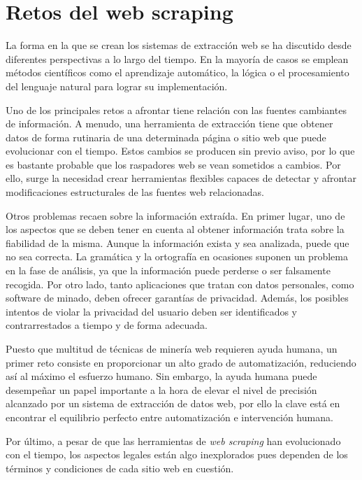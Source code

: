 \section{Retos del web scraping}
\label{sec:retos del web scraping}

La forma en la que se crean los sistemas de extracción web se ha discutido desde diferentes perspectivas
a lo largo del tiempo. En la mayoría de casos se emplean métodos científicos como el aprendizaje automático,
la lógica o el procesamiento del lenguaje natural para lograr su implementación.

Uno de los principales retos a afrontar tiene relación con las fuentes cambiantes de información. A menudo,
una herramienta de extracción tiene que obtener datos de forma rutinaria de una determinada página o sitio
web que puede evolucionar con el tiempo. Estos cambios se producen sin previo aviso, por lo que es bastante 
probable que los raspadores web se vean sometidos a cambios. Por ello, surge la necesidad crear herramientas 
flexibles capaces de detectar y afrontar modificaciones estructurales de las fuentes web relacionadas.

Otros problemas recaen sobre la información extraída. En primer lugar, uno de los aspectos que se deben
tener en cuenta al obtener información trata sobre la fiabilidad de la misma. Aunque la información exista
y sea analizada, puede que no sea correcta. La gramática y la ortografía en ocasiones suponen un problema
en la fase de análisis, ya que la información puede perderse o ser falsamente recogida. Por otro lado,
tanto aplicaciones que tratan con datos personales, como software de minado, deben ofrecer garantías de
privacidad. Además, los posibles intentos de violar la privacidad del usuario deben ser identificados
y contrarrestados a tiempo y de forma adecuada.

Puesto que multitud de técnicas de minería web requieren ayuda humana, un primer reto consiste en
proporcionar un alto grado de automatización, reduciendo así al máximo el esfuerzo humano. Sin embargo,
la ayuda humana puede desempeñar un papel importante a la hora de elevar el nivel de precisión alcanzado
por un sistema de extracción de datos web, por ello la clave está en encontrar el equilibrio perfecto entre
automatización e intervención humana.

Por último, a pesar de que las herramientas de \emph{web scraping} han evolucionado con el tiempo, los 
aspectos legales están algo inexplorados pues dependen de los términos y condiciones de cada sitio web en 
cuestión.

